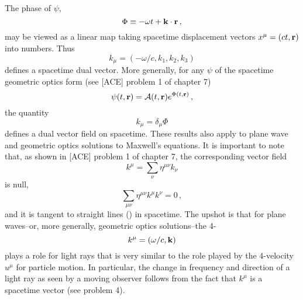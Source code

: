 The phase of $\psi$, 
\begin{equation}\label{eq:Wald_08.21}
\Phi \equiv -\omega t +  \vb{k}\cdot\vb{r} \,,
\end{equation}
may be viewed as a linear map taking spacetime displacement vectors $x^\mu = (ct, \vb{r})$ into numbers. Thus 
\begin{equation}\label{eq:Wald_08.22}
k_\mu = (-\omega/c, k_1, k_2, k_3)
\end{equation}
defines a spacetime dual vector. More generally, for any $\psi$ of the spacetime geometric optics form (see [ACE] problem 1 of chapter 7)
\begin{equation}\label{eq:Wald_08.23}
\psi(t, \vb{r}) = \A(t, \vb{r}) \vexp{\Phi(t, \vb{r})}\,,
\end{equation}
the quantity 
\begin{equation}\label{eq:Wald_08.24}
k_\mu = \delta_\mu \Phi
\end{equation}
defines a dual vector field on spacetime. These results also apply to plane wave and geometric optics solutions to Maxwell's equations. It is important to note that, as shown in [ACE] problem 1 of chapter 7, the corresponding vector field 
\begin{equation}\label{eq:Wald_08.25}
k^\mu = \sum_\nu \eta^{\mu\nu} k_\nu
\end{equation}
is null, $$ \sum_{\mu\nu} \eta^{\mu\nu} k^\mu k^\nu = 0\,,$$
and it is tangent to straight lines () in spacetime. The upshot is that for plane waves--or, more generally, geometric optics solutions--the  4-
\begin{equation}\label{eq:Wald_08.26}
k^\mu = (\omega/c, \vb{k})
\end{equation}
plays a role for light rays that is very similar to the role played by the 4-velocity $u^\mu$ for particle motion. In particular, the change in frequency and direction of a light ray as seen by a moving observer follows from the fact that $k^\mu$ is a spacetime vector (see problem 4).

